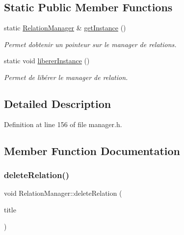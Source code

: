 \subsection*{Static Public Member Functions}
\begin{DoxyCompactItemize}
\item 
\mbox{\label{class_relation_manager_a35c3622f29ccfbda84be848503041396}} 
static \hyperlink{class_relation_manager}{Relation\+Manager} \& \hyperlink{class_relation_manager_a35c3622f29ccfbda84be848503041396}{get\+Instance} ()
\begin{DoxyCompactList}\small\item\em Permet d\textquotesingle{}obtenir un pointeur sur le manager de relations. \end{DoxyCompactList}\item 
\mbox{\label{class_relation_manager_a64126ecfdd2046d9c9797e80427bcba3}} 
static void \hyperlink{class_relation_manager_a64126ecfdd2046d9c9797e80427bcba3}{liberer\+Instance} ()
\begin{DoxyCompactList}\small\item\em Permet de libérer le manager de relation. \end{DoxyCompactList}\end{DoxyCompactItemize}


\subsection{Detailed Description}


Definition at line 156 of file manager.\+h.



\subsection{Member Function Documentation}
\mbox{\label{class_relation_manager_a074413b3ed72a1342821e911c1fa3587}} 
\subsubsection{\texorpdfstring{delete\+Relation()}{deleteRelation()}}
{\footnotesize\ttfamily void Relation\+Manager\+::delete\+Relation (\begin{DoxyParamCaption}\item[{const Q\+String \&}]{title }\end{DoxyParamCaption})}



